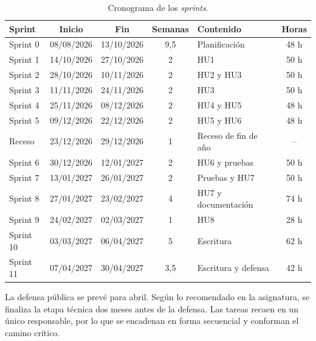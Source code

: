 \documentclass[
11pt, %
codirector, %
]{charter}
\begin{document}
\begin{table}[!htpb]
\centering
\caption{Cronograma de los \textit{sprints}.}
\label{tab:cronograma}
\begin{tabularx}{\linewidth}{@{}|l|c|c|c|X|c|@{}}
\hline
\rowcolor[HTML]{C0C0C0}
Sprint & Inicio & Fin & Semanas & Contenido & Horas \\ \hline
Sprint 0 & 08/08/2026 & 13/10/2026 & 9,5 & Planificación & 48 h \\ \hline
Sprint 1 & 14/10/2026 & 27/10/2026 & 2 & HU1 & 50 h \\ \hline
Sprint 2 & 28/10/2026 & 10/11/2026 & 2 & HU2 y HU3 & 50 h \\ \hline
Sprint 3 & 11/11/2026 & 24/11/2026 & 2 & HU3 & 50 h \\ \hline
Sprint 4 & 25/11/2026 & 08/12/2026 & 2 & HU4 y HU5 & 48 h \\ \hline
Sprint 5 & 09/12/2026 & 22/12/2026 & 2 & HU5 y HU6 & 48 h \\ \hline
Receso & 23/12/2026 & 29/12/2026 & 1 & Receso de fin de año & -- \\ \hline
Sprint 6 & 30/12/2026 & 12/01/2027 & 2 & HU6 y pruebas & 50 h \\ \hline
Sprint 7 & 13/01/2027 & 26/01/2027 & 2 & Pruebas y HU7 & 50 h \\ \hline
Sprint 8 & 27/01/2027 & 23/02/2027 & 4 & HU7 y documentación & 74 h \\ \hline
Sprint 9 & 24/02/2027 & 02/03/2027 & 1 & HU8 & 28 h \\ \hline
Sprint 10 & 03/03/2027 & 06/04/2027 & 5 & Escritura & 62 h \\ \hline
Sprint 11 & 07/04/2027 & 30/04/2027 & 3,5 & Escritura y defensa & 42 h \\ \hline
\end{tabularx}
\end{table}

La defensa pública se prevé para abril. Según lo recomendado en la asignatura, se finaliza la etapa técnica dos meses antes de la defensa. Las tareas recaen en un único responsable, por lo que se encadenan en forma secuencial y conforman el camino crítico.
\end{document}
